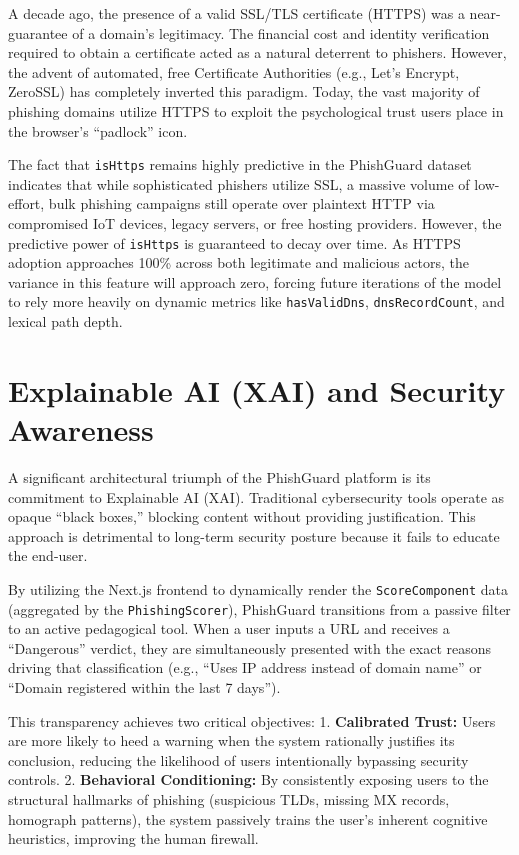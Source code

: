 A decade ago, the presence of a valid SSL/TLS certificate (HTTPS) was a
near-guarantee of a domain's legitimacy. The financial cost and identity
verification required to obtain a certificate acted as a natural
deterrent to phishers. However, the advent of automated, free
Certificate Authorities (e.g., Let's Encrypt, ZeroSSL) has completely
inverted this paradigm. Today, the vast majority of phishing domains
utilize HTTPS to exploit the psychological trust users place in the
browser's ``padlock'' icon.

The fact that \texttt{isHttps} remains highly predictive in the
PhishGuard dataset indicates that while sophisticated phishers utilize
SSL, a massive volume of low-effort, bulk phishing campaigns still
operate over plaintext HTTP via compromised IoT devices, legacy servers,
or free hosting providers. However, the predictive power of
\texttt{isHttps} is guaranteed to decay over time. As HTTPS adoption
approaches 100\% across both legitimate and malicious actors, the
variance in this feature will approach zero, forcing future iterations
of the model to rely more heavily on dynamic metrics like
\texttt{hasValidDns}, \texttt{dnsRecordCount}, and lexical path depth.

\section{Explainable AI (XAI) and Security
Awareness}\label{explainable-ai-xai-and-security-awareness}

A significant architectural triumph of the PhishGuard platform is its
commitment to Explainable AI (XAI). Traditional cybersecurity tools
operate as opaque ``black boxes,'' blocking content without providing
justification. This approach is detrimental to long-term security
posture because it fails to educate the end-user.

By utilizing the Next.js frontend to dynamically render the
\texttt{ScoreComponent} data (aggregated by the
\texttt{PhishingScorer}), PhishGuard transitions from a passive filter
to an active pedagogical tool. When a user inputs a URL and receives a
``Dangerous'' verdict, they are simultaneously presented with the exact
reasons driving that classification (e.g., ``Uses IP address instead of
domain name'' or ``Domain registered within the last 7 days'').

This transparency achieves two critical objectives: 1.
\textbf{Calibrated Trust:} Users are more likely to heed a warning when
the system rationally justifies its conclusion, reducing the likelihood
of users intentionally bypassing security controls. 2.
\textbf{Behavioral Conditioning:} By consistently exposing users to the
structural hallmarks of phishing (suspicious TLDs, missing MX records,
homograph patterns), the system passively trains the user's inherent
cognitive heuristics, improving the human firewall.

